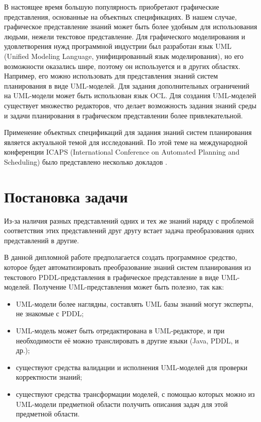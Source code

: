 \documentclass[a4paper,14pt]{extreport}
\begin{document}
    В настоящее время большую популярность приобретают графические представления, основанные на объектных спецификациях. В нашем случае, графическое представление знаний может быть более удобным для использования людьми, нежели текстовое представление. Для графического моделирования и удовлетворения нужд программной индустрии был разработан язык UML\cite{rambo-uml2} (Unified Modeling Language, унифицированный язык моделирования), но его возможности оказались шире, поэтому он используется и в других областях. Например, его можно использовать для представления знаний систем планирования в виде UML-моделей. Для задания дополнительных ограничений на UML-модели может быть использован язык OCL\cite{ocl}. Для создания UML-моделей существует множество редакторов, что делает возможность задания знаний среды и задачи планирования в графическом представлении более привлекательной. 
    
    Применение объектных спецификаций для задания знаний систем планирования является актуальной темой для исследований.  По этой теме на международной конференции ICAPS (International Conference on Automated Planning and Scheduling) было представлено несколько докладов \cite{icaps-1, icaps-2}.
    
   
    
\section*{Постановка задачи}

     Из-за наличия разных представлений одних и тех же знаний наряду с проблемой соответствия этих представлений друг другу встает задача преобразования одних представлений в другие. 

    В данной дипломной работе предполагается создать программное средство, которое будет автоматизировать преобразование знаний систем планирования из текстового PDDL-представления в графическое представление в виде UML-моделей. Получение UML-представления может быть полезно, так как:
    \begin{itemize}
        \item UML-модели более наглядны, составлять UML базы знаний могут эксперты, не знакомые с PDDL;
        \item UML-модель может быть отредактирована в UML-редакторе, и при необходимости её можно транслировать в другие языки (Java, PDDL, и~ др.);
        \item существуют средства валидации и исполнения UML-моделей для проверки корректности знаний\cite{use}; 
        \item существуют средства трансформации моделей, с помощью которых можно из UML-модели предметной области получить описания задач для этой предметной области.
    \end{itemize}
\end{document}
